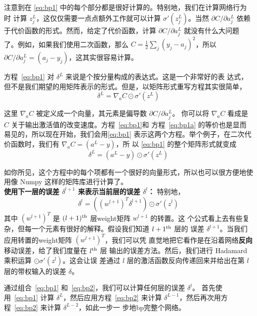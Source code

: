 注意到在 \eqref{eq:bp1} 中的每个部分都是很好计算的。特别地，我们在计算网络行为时
计算 $z_j^L$，这仅仅需要一点点额外工作就可以计算 $\sigma'(z_j^L)$。当然
$\partial C/\partial a_j^L$ 依赖于代价函数的形式。然而，给定了代价函数，计算
$\partial C/\partial a_j^L$ 就没有什么大问题了。例如，如果我们使用二次函数，那么
$C = \frac{1}{2} \sum_j(y_j-a_j)^2$，所以 $\partial C/\partial a_j^L = (a_j -
y_j)$，这其实很容易计算。

方程~\eqref{eq:bp1} 对 $\delta^L$ 来说是个按分量构成的表达式。这是一个非常好的表
达式，但不是我们期望的用矩阵表示的形式。但是，以矩阵形式重写方程其实很简单，
\begin{equation}
  \delta^L = \nabla_a C \odot \sigma'(z^L)
  \label{eq:bp1a}\tag{BP1a}
\end{equation}

这里 $\nabla_a C$ 被定义成一个向量，其元素是偏导数 $\partial C/\partial a_j^L$。
你可以将 $\nabla_a C$ 看成是 $C$ 关于输出激活值的改变速度。方程~\eqref{eq:bp1}和
方程~\eqref{eq:bp1a} 的等价也是显而易见的，所以现在开始，我们会用\eqref{eq:bp1}
表示这两个方程。举个例子，在二次代价函数时，我们有 $\nabla_a C = (a^L - y)$，所
以 \eqref{eq:bp1} 的整个矩阵形式就变成
\begin{equation}
  \delta^L = (a^L-y) \odot \sigma'(z^L)
  \label{eq:30}\tag{30}
\end{equation}

如你所见，这个方程中的每个项都有一个很好的向量形式，所以也可以很方便地使用像
Numpy 这样的矩阵库进行计算了。\\

\textbf{使用下一层的误差 $\delta^{l+1}$ 来表示当前层的误差 $\delta^l$：} 特别地，
\begin{equation}
  \delta^l = ((w^{l+1})^T \delta^{l+1}) \odot \sigma'(z^l)
  \label{eq:bp2}\tag{BP2}
\end{equation}
其中 $(w^{l+1})^T$ 是 $(l+1)^{\rm th}$ 层\gls*{weight}矩阵 $w^{l+1}$ 的转置。这
个公式看上去有些复杂，但每一个元素有很好的解释。假设我们知道 $l+1^{\rm th}$ 层的
误差 $\delta^{l+1}$。当我们应用转置的\gls*{weight}矩阵 $(w^{l+1})^T$，我们可以凭
直觉地把它看作是在沿着网络\textbf{反向}移动误差，给了我们度量在 $l^{\rm th}$ 层
输出的误差方法。然后，我们进行 Hadamard 乘积运算 $\odot \sigma'(z^l)$。这会让误
差通过 $l$ 层的激活函数反向传递回来并给出在第 $l$ 层的带权输入的误差 $\delta$。

通过组合~\eqref{eq:bp1} 和~\eqref{eq:bp2}，我们可以计算任何层的误差 $\delta^l$。
首先使用~\eqref{eq:bp1} 计算 $\delta^L$，然后应用方程~\eqref{eq:bp2} 来计算
$\delta^{L-1}$，然后再次用方程~\eqref{eq:bp2} 来计算 $\delta^{L-2}$，如此一步一
步地\gls*{bp}完整个网络。\\

